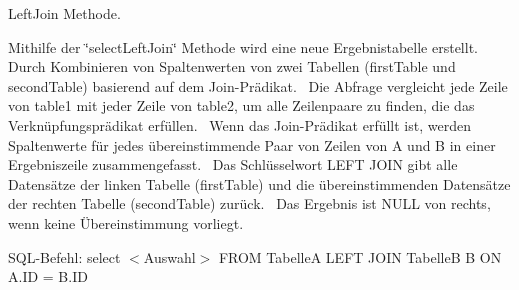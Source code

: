 Left\+Join Methode. 

Mithilfe der \char`\"{}select\+Left\+Join\char`\"{} Methode wird eine neue Ergebnistabelle erstellt.~\newline
 Durch Kombinieren von Spaltenwerten von zwei Tabellen (first\+Table und second\+Table) basierend auf dem Join-\/\+Prädikat.~\newline
 Die Abfrage vergleicht jede Zeile von table1 mit jeder Zeile von table2, um alle Zeilenpaare zu finden, die das Verknüpfungsprädikat erfüllen.~\newline
 Wenn das Join-\/\+Prädikat erfüllt ist, werden Spaltenwerte für jedes übereinstimmende Paar von Zeilen von A und B in einer Ergebniszeile zusammengefasst.~\newline
 Das Schlüsselwort L\+E\+FT J\+O\+IN gibt alle Datensätze der linken Tabelle (first\+Table) und die übereinstimmenden Datensätze der rechten Tabelle (second\+Table) zurück.~\newline
 Das Ergebnis ist N\+U\+LL von rechts, wenn keine Übereinstimmung vorliegt.~\newline


S\+Q\+L-\/\+Befehl\+: select $<$\+Auswahl$>$ F\+R\+OM TabelleA L\+E\+FT J\+O\+IN TabelleB B ON A.\+ID = B.\+ID


